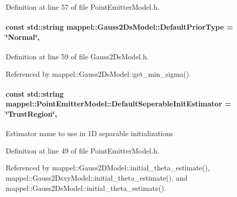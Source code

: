 Definition at line 57 of file Point\+Emitter\+Model.\+h.

\paragraph[{\texorpdfstring{Default\+Prior\+Type}{DefaultPriorType}}]{\setlength{\rightskip}{0pt plus 5cm}const std\+::string mappel\+::\+Gauss2\+Ds\+Model\+::\+Default\+Prior\+Type = \char`\"{}Normal\char`\"{}\hspace{0.3cm}{\ttfamily [static]}, {\ttfamily [inherited]}}\hypertarget{classmappel_1_1Gauss2DsModel_ac00cce582449c74c64f624ec85c9e164}{}\label{classmappel_1_1Gauss2DsModel_ac00cce582449c74c64f624ec85c9e164}


Definition at line 59 of file Gauss2\+Ds\+Model.\+h.



Referenced by mappel\+::\+Gauss2\+Ds\+Model\+::get\+\_\+min\+\_\+sigma().

\paragraph[{\texorpdfstring{Default\+Seperable\+Init\+Estimator}{DefaultSeperableInitEstimator}}]{\setlength{\rightskip}{0pt plus 5cm}const std\+::string mappel\+::\+Point\+Emitter\+Model\+::\+Default\+Seperable\+Init\+Estimator = \char`\"{}Trust\+Region\char`\"{}\hspace{0.3cm}{\ttfamily [static]}, {\ttfamily [inherited]}}\hypertarget{classmappel_1_1PointEmitterModel_ad8c3dc629d75d22f25855a5f1ba8729f}{}\label{classmappel_1_1PointEmitterModel_ad8c3dc629d75d22f25855a5f1ba8729f}
Estimator name to use in 1D separable initializations 

Definition at line 49 of file Point\+Emitter\+Model.\+h.



Referenced by mappel\+::\+Gauss2\+D\+Model\+::initial\+\_\+theta\+\_\+estimate(), mappel\+::\+Gauss2\+Dsxy\+Model\+::initial\+\_\+theta\+\_\+estimate(), and mappel\+::\+Gauss2\+Ds\+Model\+::initial\+\_\+theta\+\_\+estimate().


